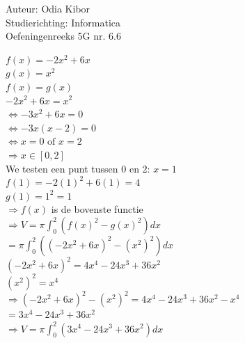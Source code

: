 \documentclass[a4paper]{article}
\begin{document}
  
\noindent \large Auteur: Odia Kibor \\
\noindent \large Studierichting: Informatica\\
\noindent \large Oefeningenreeks 5G nr. 6.6
\\

\medskip

\normalsize


$ f(x) = -2x^2 + 6x $\\

$ g(x) = x^2 $\\

$ f(x) = g(x) $\\

$ -2x^2 + 6x = x^2 $\\

$ \Leftrightarrow -3x^2 + 6x = 0 $\\

$ \Leftrightarrow -3x(x - 2) = 0 $\\

$ \Leftrightarrow x = 0 \text{ of } x = 2 $\\

$\Rightarrow x \in [0, 2]$\\

We testen een punt tussen $0$ en $2$:  $x = 1$\\

$ f(1) = -2(1)^2 + 6(1) = 4 $\\

$ g(1) = 1^2 = 1 $\\

$\Rightarrow f(x)$ is de bovenste functie\\

$\Rightarrow V = \pi \displaystyle\int_0^2 \left(f(x)^2 - g(x)^2\right)dx$\\

$= \pi \displaystyle\int_0^2 \left((-2x^2 + 6x)^2 - (x^2)^2\right)dx$\\

$(-2x^2 + 6x)^2 = 4x^4 - 24x^3 + 36x^2$\\

$(x^2)^2 = x^4$\\

$\Rightarrow (-2x^2 + 6x)^2 - (x^2)^2 = 4x^4 - 24x^3 + 36x^2 - x^4$\\

$= 3x^4 - 24x^3 + 36x^2$\\

$\Rightarrow V = \pi \displaystyle\int_0^2 (3x^4 - 24x^3 + 36x^2)dx$\\
\end{document}
